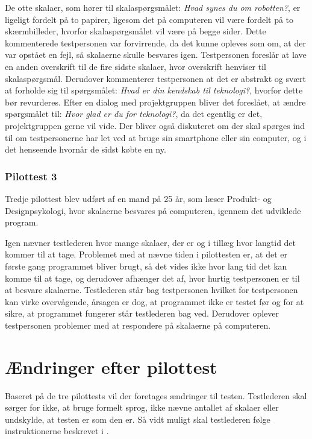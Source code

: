 De otte skalaer, som hører til skalaspørgsmålet: \textit{Hvad synes du om robotten?}, er ligeligt fordelt på to papirer, ligesom det på computeren vil være fordelt på to skærmbilleder, hvorfor skalaspørgsmålet vil være på begge sider. Dette kommenterede testpersonen var forvirrende, da det kunne opleves som om, at der var opstået en fejl, så skalaerne skulle besvares igen. Testpersonen foreslår at lave en anden overskrift til de fire sidste skalaer, hvor overskrift henviser til skalaspørgsmål. Derudover kommenterer testpersonen at det er abstrakt og svært at forholde sig til spørgsmålet: \textit{Hvad er din kendskab til teknologi?}, hvorfor dette bør revurderes. Efter en dialog med projektgruppen bliver det foreslået, at ændre spørgsmålet til: \textit{Hvor glad er du for teknologi?}, da det egentlig er det, projektgruppen gerne vil vide. Der bliver også diskuteret om der skal spørges ind til om testpersonerne har let ved at bruge sin smartphone eller sin computer, og i det henseende hvornår de sidst købte en ny. 

\subsubsection*{Pilottest 3}
\label{TestAfSkalaerPilot3}
%
Tredje pilottest blev udført af en mand på 25 år, som læser Produkt- og Designpsykologi, hvor skalaerne besvares på computeren, igennem det udviklede program. 

Igen nævner testlederen hvor mange skalaer, der er og i tillæg hvor langtid det kommer til at tage. Problemet med at nævne tiden i pilottesten er, at det er første gang programmet bliver brugt, så det vides ikke hvor lang tid det kan komme til at tage, og derudover afhænger det af, hvor hurtig testpersonen er til at besvare skalaerne. Testlederen står bag testpersonen hvilket for testpersonen kan virke overvågende, årsagen er dog, at programmet ikke er testet før og for at sikre, at programmet fungerer står testlederen bag ved. Derudover oplever testpersonen problemer med at respondere på skalaerne på computeren.   

\section{Ændringer efter pilottest}
\label{TestAfSkalaerAendringerPilot}
%
Baseret på de tre pilottests vil der foretages ændringer til testen. Testlederen skal sørger for ikke, at bruge formelt sprog, ikke nævne antallet af skalaer eller undskylde, at testen er som den er. Så vidt muligt skal testlederen følge instruktionerne beskrevet i .

